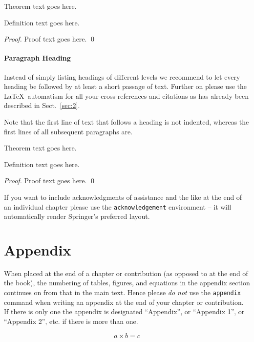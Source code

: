\documentclass[graybox]{svmult}
\begin{document}
\begin{theorem}
Theorem text goes here.
\end{theorem}
%
%
\begin{definition}
Definition text goes here.
\end{definition}

\begin{proof}
Proof text goes here.
\qed
\end{proof}

\paragraph{Paragraph Heading} %
Instead of simply listing headings of different levels we recommend to
let every heading be followed by at least a short passage of text.
Further on please use the \LaTeX\ automatism for all your
cross-references and citations as has already been described in
Sect.~\ref{sec:2}.

Note that the first line of text that follows a heading is not indented, whereas the first lines of all subsequent paragraphs are.
%
%
\begin{theorem}
Theorem text goes here.
\end{theorem}
%
\begin{definition}
Definition text goes here.
\end{definition}
%
\begin{proof}
\smartqed
Proof text goes here.
\qed
\end{proof}
%
\begin{acknowledgement}
If you want to include acknowledgments of assistance and the like at the end of an individual chapter please use the \verb|acknowledgement| environment -- it will automatically render Springer's preferred layout.
\end{acknowledgement}
%
\section*{Appendix}
%
%
When placed at the end of a chapter or contribution (as opposed to at the end of the book), the numbering of tables, figures, and equations in the appendix section continues on from that in the main text. Hence please \textit{do not} use the \verb|appendix| command when writing an appendix at the end of your chapter or contribution. If there is only one the appendix is designated ``Appendix'', or ``Appendix 1'', or ``Appendix 2'', etc. if there is more than one.

\begin{equation}
a \times b = c
\end{equation}


\end{document}
